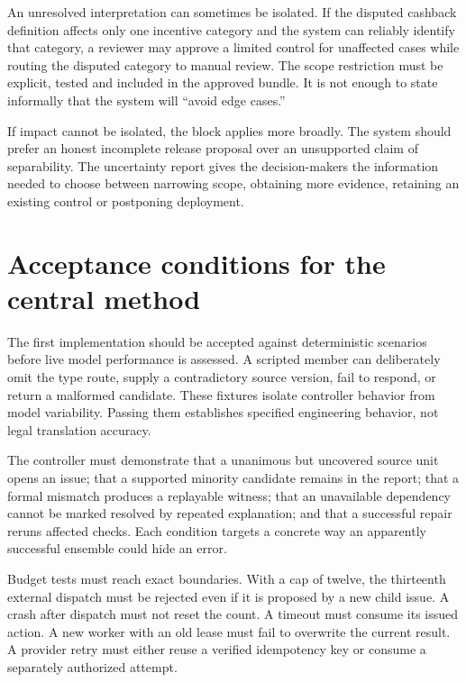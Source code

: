 An unresolved interpretation can sometimes be isolated. If the disputed cashback
definition affects only one incentive category and the system can reliably
identify that category, a reviewer may approve a limited control for unaffected
cases while routing the disputed category to manual review. The scope restriction
must be explicit, tested and included in the approved bundle. It is not enough to
state informally that the system will ``avoid edge cases.''

If impact cannot be isolated, the block applies more broadly. The system should
prefer an honest incomplete release proposal over an unsupported claim of
separability. The uncertainty report gives the decision-makers the information
needed to choose between narrowing scope, obtaining more evidence, retaining an
existing control or postponing deployment.

\section{Acceptance conditions for the central method}
\label{merge:M06:25}


The first implementation should be accepted against deterministic scenarios
before live model performance is assessed. A scripted member can deliberately
omit the type route, supply a contradictory source version, fail to respond, or
return a malformed candidate. These fixtures isolate controller behavior from
model variability. Passing them establishes specified engineering behavior, not
legal translation accuracy.

The controller must demonstrate that a unanimous but uncovered source unit opens
an issue; that a supported minority candidate remains in the report; that a
formal mismatch produces a replayable witness; that an unavailable dependency
cannot be marked resolved by repeated explanation; and that a successful repair
reruns affected checks. Each condition targets a concrete way an apparently
successful ensemble could hide an error.

Budget tests must reach exact boundaries. With a cap of twelve, the thirteenth
external dispatch must be rejected even if it is proposed by a new child issue.
A crash after dispatch must not reset the count. A timeout must consume its
issued action. A new worker with an old lease must fail to overwrite the current
result. A provider retry must either reuse a verified idempotency key or consume
a separately authorized attempt.

